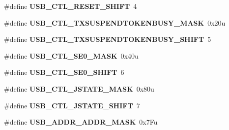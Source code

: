\begin{DoxyCompactItemize}
\item 
\hypertarget{group___u_s_b___register___masks_gac709cb60252fd6ab2775785ffc2953e6}{}\#define {\bfseries U\+S\+B\+\_\+\+C\+T\+L\+\_\+\+R\+E\+S\+E\+T\+\_\+\+S\+H\+I\+F\+T}~4\label{group___u_s_b___register___masks_gac709cb60252fd6ab2775785ffc2953e6}

\item 
\hypertarget{group___u_s_b___register___masks_gaa2e78edccdce1268888d45bc4d81cfe1}{}\#define {\bfseries U\+S\+B\+\_\+\+C\+T\+L\+\_\+\+T\+X\+S\+U\+S\+P\+E\+N\+D\+T\+O\+K\+E\+N\+B\+U\+S\+Y\+\_\+\+M\+A\+S\+K}~0x20u\label{group___u_s_b___register___masks_gaa2e78edccdce1268888d45bc4d81cfe1}

\item 
\hypertarget{group___u_s_b___register___masks_gac6b9a4253ee9f3740d0c7b2692a44e8e}{}\#define {\bfseries U\+S\+B\+\_\+\+C\+T\+L\+\_\+\+T\+X\+S\+U\+S\+P\+E\+N\+D\+T\+O\+K\+E\+N\+B\+U\+S\+Y\+\_\+\+S\+H\+I\+F\+T}~5\label{group___u_s_b___register___masks_gac6b9a4253ee9f3740d0c7b2692a44e8e}

\item 
\hypertarget{group___u_s_b___register___masks_gac4c2c3ef09a72faaab7151297e8dfbe7}{}\#define {\bfseries U\+S\+B\+\_\+\+C\+T\+L\+\_\+\+S\+E0\+\_\+\+M\+A\+S\+K}~0x40u\label{group___u_s_b___register___masks_gac4c2c3ef09a72faaab7151297e8dfbe7}

\item 
\hypertarget{group___u_s_b___register___masks_gaa3a02fa6ec226d10d54353456d44fa88}{}\#define {\bfseries U\+S\+B\+\_\+\+C\+T\+L\+\_\+\+S\+E0\+\_\+\+S\+H\+I\+F\+T}~6\label{group___u_s_b___register___masks_gaa3a02fa6ec226d10d54353456d44fa88}

\item 
\hypertarget{group___u_s_b___register___masks_ga3a56395d81066c161d523479ed340907}{}\#define {\bfseries U\+S\+B\+\_\+\+C\+T\+L\+\_\+\+J\+S\+T\+A\+T\+E\+\_\+\+M\+A\+S\+K}~0x80u\label{group___u_s_b___register___masks_ga3a56395d81066c161d523479ed340907}

\item 
\hypertarget{group___u_s_b___register___masks_gad553773ca9a02b344ab10269c999d143}{}\#define {\bfseries U\+S\+B\+\_\+\+C\+T\+L\+\_\+\+J\+S\+T\+A\+T\+E\+\_\+\+S\+H\+I\+F\+T}~7\label{group___u_s_b___register___masks_gad553773ca9a02b344ab10269c999d143}

\item 
\hypertarget{group___u_s_b___register___masks_ga7ccfd8bde2bb3831d13280315df4501c}{}\#define {\bfseries U\+S\+B\+\_\+\+A\+D\+D\+R\+\_\+\+A\+D\+D\+R\+\_\+\+M\+A\+S\+K}~0x7\+Fu\label{group___u_s_b___register___masks_ga7ccfd8bde2bb3831d13280315df4501c}


\end{DoxyCompactItemize}
